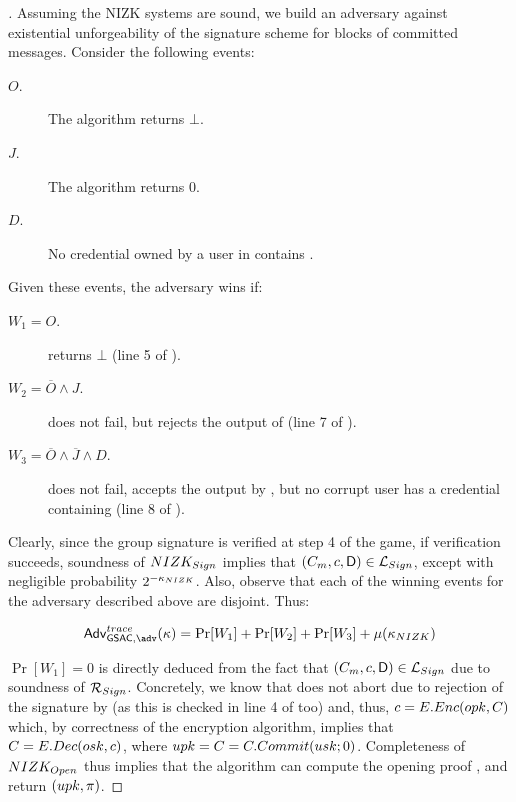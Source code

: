 \begin{proof}[]
  Assuming the NIZK systems are sound, we build an adversary against existential
  unforgeability of the signature scheme for blocks of committed messages.
  Consider the following events:

  \begin{description}
  \item[$O$.] The \Open algorithm returns $\bot$.
  \item[$J$.] The \Judge algorithm returns $0$.
  \item[$D$.] No credential owned by a user in \CU contains \DAttrs.
  \end{description}

  Given these events, the adversary wins if:

  \begin{description}
  \item[$W_1 = O$.] \Open returns $\bot$ (line 5 of \ExpGSACTrace).
  \item[$W_2 = \overline{O} \land J$.] \Open does not fail, but \Judge rejects
    the output of \Open (line 7 of \ExpGSACTrace).
  \item[$W_3 = \overline{O} \land \overline{J} \land D$.] \Open does not fail,
    \Judge accepts the output by \Open, but no corrupt user has a credential
    containing \DAttrs (line 8 of \ExpGSACTrace).
  \end{description}

  Clearly, since the group signature is verified at step 4 of the game, if
  verification succeeds, soundness of $NIZK_{Sign}$ implies that $(C_m,
  c,\mathsf{D}) \in \mathcal{L}_{Sign}$, except with negligible probability
  $2^{-\kappa_{NIZK}}$. Also, observe that each of the winning events for the
  adversary described above are disjoint. Thus:

  \begin{equation}
    \AdvGSACTrace(\secpar) = \Pr[W_1]+\Pr[W_2]+\Pr[W_3]+\negl(\NIZKsecpar)
  \end{equation}

  $\Pr[W_1]=0$ is directly deduced from the fact that $(C_m,c,\mathsf{D})
  \in \mathcal{L}_{Sign}$ due to soundness of $\mathcal{R}_{Sign}$. Concretely,
  we know that \Open does not abort due to rejection of the signature by
  \Verify (as this is checked in line 4 of \ExpGSACTrace too) and, thus,
  $c = E.Enc(opk,C)$ which, by correctness of the encryption algorithm,
  implies that $C = E.Dec(osk,c)$, where $upk=C=C.Commit(usk;0)$.
  Completeness of $NIZK_{Open}$ thus implies that the \Open algorithm can
  compute the opening proof \oproof, and return $(upk,\pi)$.
  

\end{proof}
